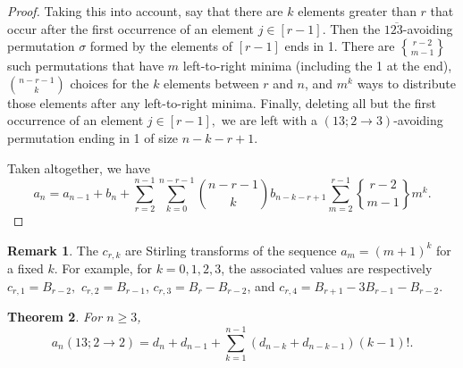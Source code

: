 \documentclass[11pt]{article}
\newtheorem{theorem}{Theorem}[section]
\theoremstyle{definition}
\newtheorem{remark}[theorem]{Remark}
\newcommand{\stirling}[2]{\genfrac{\{}{\}}{0pt}{}{#1}{#2}}
\begin{document}
\begin{proof}
 Taking this into account, say that there are $k$ elements greater than $r$ that occur after the first occurrence of an element $j\in[r-1].$ Then the $1\overline{23}$-avoiding permutation $\sigma$ formed by the elements of $[r-1]$ ends in 1. There are $\stirling{r-2}{m-1}$ such permutations that have $m$ left-to-right minima (including the 1 at the end), $\binom{n-r-1}{k}$ choices for the $k$ elements between $r$ and $n$, and $m^k$ ways to distribute those elements after any left-to-right minima. Finally, deleting all but the first occurrence of an element $j\in[r-1],$ we are left with a $(13;2\to3)$-avoiding permutation ending in 1 of size $n-k-r+1.$

Taken altogether, we have 
 \[a_n = a_{n-1}+b_n + \sum_{r=2}^{n-1}\sum_{k=0}^{n-r-1}\binom{n-r-1}{k}b_{n-k-r+1} \sum_{m=2}^{r-1} \stirling{r-2}{m-1}m^k.\]
\end{proof}

\begin{remark}
    The $c_{r,k}$ are Stirling transforms of the sequence $a_m = (m+1)^k$ for a fixed $k$. For example, for $k=0,1,2,3$, the associated values are respectively $c_{r,1}=B_{r-2},$ $c_{r,2}=B_{r-1}$, $c_{r,3}=B_r - B_{r-2}$, and $c_{r,4}=B_{r+1} - 3B_{r-1} - B_{r-2}$.
\end{remark}

\begin{theorem} \label{thm:13t22}
    For $n \geq 3$, \[a_n(13;2\to2) = d_n + d_{n-1} + \sum_{k=1}^{n-1} (d_{n-k} + d_{n-k-1})(k-1)!.\]
\end{theorem}
\end{document}
